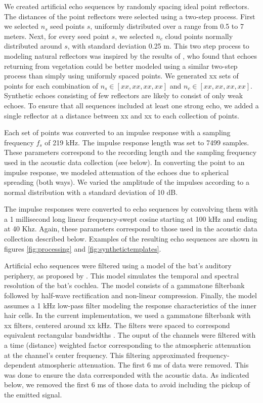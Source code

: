 \documentclass[preprint,5p]{elsarticle}
\begin{document}
We created artificial echo sequences by randomly spacing ideal point reflectors. The distances of the point reflectors were selected using a two-step process. First we selected $n_{s}$ seed points $s$, uniformly distributed over a range from 0.5 to 7 meters. Next, for every seed point $s$, we selected $n_{c}$ cloud points normally distributed around $s$, with standard deviation 0.25 m. This two step process to modeling natural reflectors was inspired by the results of \citet{Yovel2009}, who found that echoes returning from vegetation could be better modeled using a similar two-step process than simply using uniformly spaced points. We generated xx sets of points for each combination of $n_s \in [xx,xx,xx, xx]$ and $n_c \in [xx, xx, xx, xx]$. Synthetic echoes consisting of few reflectors are likely to consist of only weak echoes. To ensure that all sequences included at least one strong echo, we added a single reflector at a distance between xx and xx to each collection of points.

Each set of points was converted to an impulse response with a sampling frequency $f_s$ of 219 kHz. The impulse response length was set to 7499 samples. These parameters correspond to the recording length and the sampling frequency used in the acoustic data collection (see below). In converting the point to an impulse response, we modeled attenuation of the echoes due to spherical spreading (both ways). We varied the amplitude of the impulses according to a normal distribution with a standard deviation of 10 dB. 

The impulse responses were converted to echo sequences by convolving them with a 1 millisecond long linear frequency-swept cosine starting at 100 kHz and ending at 40 Khz. Again, these parameters correspond to those used in the acoustic data collection described below. Examples of the resulting echo sequences are shown in figures \ref{fig:processing} and \ref{fig:synthetictemplates}. 

Artificial echo sequences were filtered using a model of the bat's auditory periphery, as proposed by \citet{Wiegrebe2008}. This model simulates the temporal and spectral resolution of the bat's cochlea. The model consists of a gammatone filterbank followed by half-wave rectification and non-linear compression. Finally, the model assumes a 1 kHz low-pass filter modeling the response characteristics of the inner hair cells. In the current implementation, we used a gammatone filterbank with xx filters, centered around xx kHz. The filters were spaced to correspond equivalent rectangular bandwidths \citep{Glasberg1990}.  The ouput of the channels were filtered with a time (distance) weighted factor corresponding to the atmospheric attenuation at the channel's center frequency. This filtering approximated frequency-dependent atmospheric attenuation. The first 6 ms of data were removed. This was done to ensure the data corresponded with the acoustic data. As indicated below, we removed the first 6 ms of those data to avoid including the pickup of the emitted signal. 
\end{document}
